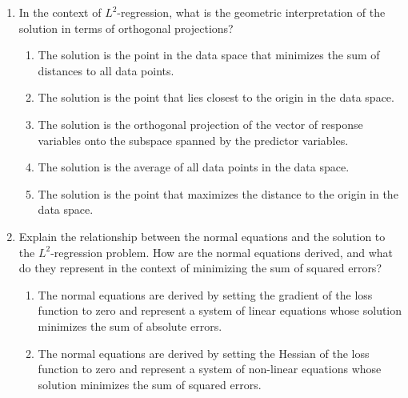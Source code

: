 \documentclass{article}%
\begin{document}
\begin{enumerate}
\begin{enumerate}%
\item The solution represents the point in the column space of the design matrix that is closest to the vector of observed responses. This is achieved by orthogonally projecting the response vector onto the column space.%
\item The solution minimizes the sum of squared distances between the data points and the origin.%
\item The solution finds the line that passes through the most data points.%
\item The solution minimizes the sum of absolute distances between the data points and the fitted model.%
\item The solution is the average of the data points.%
\end{enumerate}%
\vspace{1em}%
\item In the context of $L^2$-regression, what is the geometric interpretation of the solution in terms of orthogonal projections?%
\begin{enumerate}%
\item The solution is the point in the data space that minimizes the sum of distances to all data points.%
\item The solution is the point that lies closest to the origin in the data space.%
\item The solution is the orthogonal projection of the vector of response variables onto the subspace spanned by the predictor variables.%
\item The solution is the average of all data points in the data space.%
\item The solution is the point that maximizes the distance to the origin in the data space.%
\end{enumerate}%
\vspace{1em}%
\item Explain the relationship between the normal equations and the solution to the $L^2$-regression problem. How are the normal equations derived, and what do they represent in the context of minimizing the sum of squared errors?%
\begin{enumerate}%
\item The normal equations are derived by setting the gradient of the loss function to zero and represent a system of linear equations whose solution minimizes the sum of absolute errors.%
\item The normal equations are derived by setting the Hessian of the loss function to zero and represent a system of non-linear equations whose solution minimizes the sum of squared errors.%

\end{enumerate}
\end{enumerate}
\end{document}
